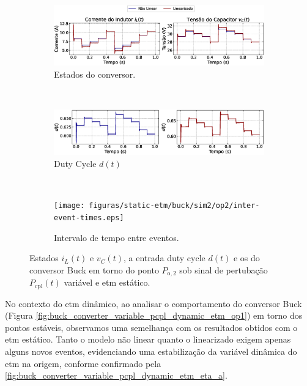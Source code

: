 \begin{figure}[H]
  \centering
  \captionsetup{justification=centering}
  \begin{subfigure}{1.\textwidth}
    \centering
    \includegraphics[width=1.\textwidth]{figuras/static-etm/buck/sim2/op2/result.eps}
    \caption{Estados do conversor.}
    \label{fig:buck_converter_variable_pcpl_static_etm_op2_duty_a}
  \end{subfigure}
  \\[6pt]
  \begin{subfigure}{1.\textwidth}
    \centering
    \includegraphics[width=1.\textwidth]{figuras/static-etm/buck/sim2/op2/duty-cycle.eps}
    \caption{Duty Cycle $d(t)$}
    \label{fig:buck_converter_variable_pcpl_static_etm_op2_duty_b}
  \end{subfigure}
  \\[6pt]
  \begin{subfigure}{1.\textwidth}
    \centering
    \texttt{[image: figuras/static-etm/buck/sim2/op2/inter-event-times.eps]}
    \caption{Intervalo de tempo entre eventos.}
    \label{fig:buck_converter_variable_pcpl_static_etm_op2_duty_c}
  \end{subfigure}
  \caption{Estados $i_L(t)$ e $v_C(t)$, a entrada duty cycle $d(t)$ e os  do conversor Buck em torno do ponto $P_{\mathrm{o}, 2}$ sob sinal de pertubação $P_{\mathrm{cpl}}(t)$ variável e \acrshort{etm} estático.}
\end{figure}

No contexto do \acrshort{etm} dinâmico, ao analisar o comportamento do conversor Buck (Figura \ref{fig:buck_converter_variable_pcpl_dynamic_etm_op1}) em torno dos pontos estáveis, observamos uma semelhança com os resultados obtidos com o \acrshort{etm} estático. Tanto o modelo não linear quanto o linearizado exigem apenas alguns novos eventos, evidenciando uma estabilização da variável dinâmica do \acrshort{etm} na origem, conforme confirmado pela \autoref{fig:buck_converter_variable_pcpl_dynamic_etm_eta_a}.

